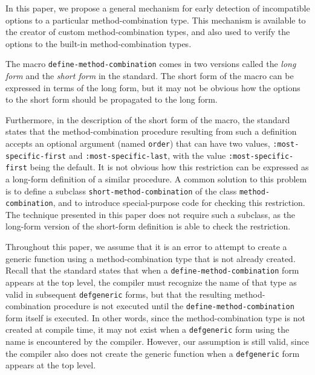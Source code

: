 In this paper, we propose a general mechanism for early detection of
incompatible options to a particular method-combination type.  This
mechanism is available to the creator of custom method-combination
types, and also used to verify the options to the built-in
method-combination types.

The macro \texttt{define-method-combination} comes in two versions
called the \emph{long form} and the \emph{short form} in the
\commonlisp{} standard.  The short form of the macro can be expressed
in terms of the long form, but it may not be obvious how the options
to the short form should be propagated to the long form.

Furthermore, in the description of the short form of the macro, the
standard states that the method-combination procedure resulting from
such a definition accepts an optional argument (named \texttt{order})
that can have two values, \texttt{:most-specific-first} and
\texttt{:most-specific-last}, with the value
\texttt{:most-specific-first} being the default.  It is not obvious
how this restriction can be expressed as a long-form definition of a
similar procedure.  A common solution to this problem is to define a
subclass \texttt{short-method-combination} of the class
\texttt{method-combination}, and to introduce special-purpose code for
checking this restriction.  The technique presented in this paper does
not require such a subclass, as the long-form version of the
short-form definition is able to check the restriction.

Throughout this paper, we assume that it is an error to attempt to
create a generic function using a method-combination type that is not
already created.  Recall that the standard states that when a
\texttt{define-method-combination} form appears at the top level, the
compiler must recognize the name of that type as valid in subsequent
\texttt{defgeneric} forms, but that the resulting method-combination
procedure is not executed until the \texttt{define-method-combination}
form itself is executed.  In other words, since the method-combination
type is not created at compile time, it may not exist when a
\texttt{defgeneric} form using the name is encountered by the
compiler.  However, our assumption is still valid, since the compiler
also does not create the generic function when a \texttt{defgeneric}
form appears at the top level.

